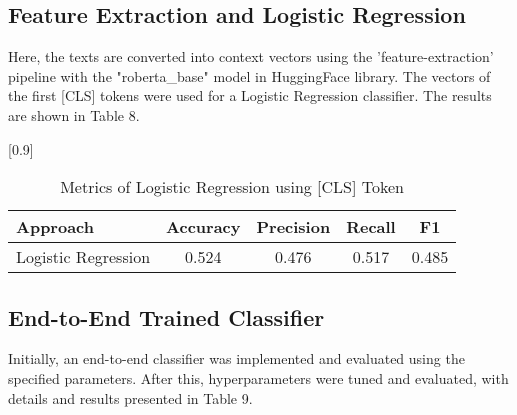 \documentclass[a4paper,11pt]{article}
\begin{document}
\subsection{Feature Extraction and Logistic Regression}
Here, the texts are converted into context vectors using the 'feature-extraction' pipeline with the "roberta\_base" model in HuggingFace library.
The vectors of the first [CLS] tokens were used for a Logistic Regression classifier.
The results are shown in Table 8.

\begin{table}[htbp]
    \centering
    \caption{Metrics of Logistic Regression using [CLS] Token}
    \scalebox{0.9}[0.9]{
    \begin{tabular}{l|cccc}
         Approach & Accuracy & Precision & Recall & F1 \\ \hline 
         Logistic Regression & 0.524 & 0.476 & 0.517 & 0.485 \\ 

    \end{tabular}

    }
\end{table}
\subsection{End-to-End Trained Classifier}




Initially, an end-to-end classifier was implemented and evaluated using the specified parameters.
After this, hyperparameters were tuned and evaluated, with details and results presented in Table 9.
\end{document}
